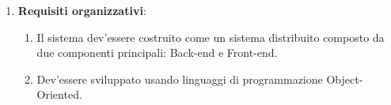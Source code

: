 \documentclass{article}
\begin{document}
\begin{enumerate}
\begin{itemize}
\begin{enumerate}
                    \end{enumerate}
              \item \textbf{Scalabilità}: \begin{enumerate}
                        \item Il sistema dovrebbe supportare la distribuzione su server cloud scalabili come AWS e Azure.
                    \end{enumerate}
              \item \textbf{Manutenibilità}: \begin{enumerate}
                        \item Il codice dovrebbe essere modulare per semplificare l'integrazione di nuove funzionalità.
                    \end{enumerate}
          \end{itemize}
    \item \textbf{Requisiti organizzativi}: \begin{enumerate}
              \item Il sistema dev'essere costruito come un sistema distribuito composto da due componenti principali: Back-end e Front-end.
              \item Dev'essere sviluppato usando linguaggi di programmazione Object-Oriented.
          \end{enumerate}
\end{enumerate}

\newpage
\end{document}
